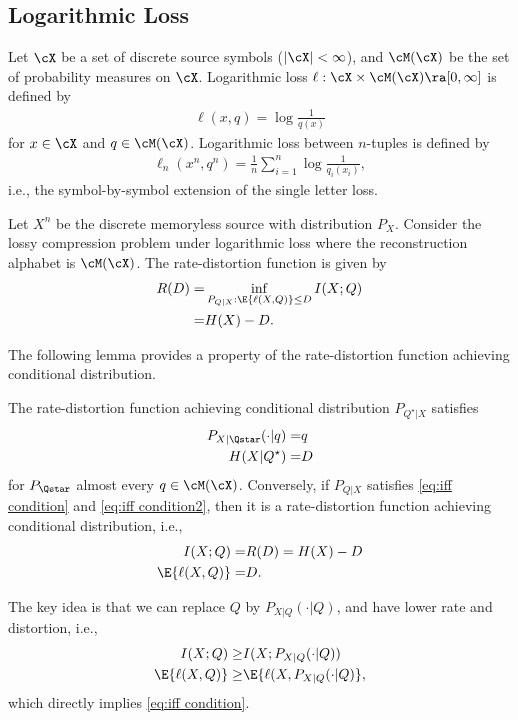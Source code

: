 \documentclass[draftclsnofoot, onecolumn, letterpaper, romanappendices]{IEEEtran}
\begin{document}
\subsection{Logarithmic Loss}\label{subsec:Logarithmic Loss}
Let $\cX$ be a set of discrete source symbols ($|\cX|<\infty$),
and $\cM(\cX)$ be the set of probability measures on $\cX$.
Logarithmic loss $\ell:\cX\times \cM(\cX) \ra [0,\infty]$ is defined by
\begin{align*}
    \ell(x,q) = \log \frac{1}{q(x)}
\end{align*}
for $x\in\cX$ and $q\in\cM(\cX)$. Logarithmic loss between $n$-tuples is defined by
\begin{align*}
    \ell_n(x^n,q^n) = \frac{1}{n}\sum_{i=1}^n\log \frac{1}{q_i(x_i)},
\end{align*}
i.e., the symbol-by-symbol extension of the single letter loss.

Let $X^n$ be the discrete memoryless source with distribution $P_X$.
Consider the lossy compression problem under logarithmic loss where
the reconstruction alphabet is $\cM(\cX)$.
The rate-distortion function is given by
\begin{align*}
    R(D) =& \inf_{P_{Q|X}: \E{\ell(X,Q)}\leq D} I(X;Q)\\
         =& H(X)-D.
\end{align*}

The following lemma provides a property of the rate-distortion function achieving
conditional distribution.
\begin{lemma}\label{lem:iff condition}
    The rate-distortion function achieving conditional distribution $P_{Q^\star|X}$ satisfies
    \begin{align}
        P_{X|\Qstar}(\cdot|q) =& q \label{eq:iff condition}\\
        H(X|Q^\star) =& D\label{eq:iff condition2}
    \end{align}
    for $P_{\Qstar}$ almost every $q\in\cM(\cX)$. 
    Conversely, if $P_{Q|X}$ satisfies \eqref{eq:iff condition} and \eqref{eq:iff condition2},
    then it is a rate-distortion function achieving conditional distribution, i.e.,
    \begin{align*}
        I(X;Q) =& R(D) = H(X)-D\\
        \E{\ell(X,Q)} =& D.
    \end{align*}
\end{lemma}
The key idea is that we can replace $Q$ by $P_{X|Q}(\cdot|Q)$,
and have lower rate and distortion, i.e.,
\begin{align*}
    I(X;Q) \geq& I(X;P_{X|Q}(\cdot|Q))\\
    \E{\ell(X,Q)} \geq& \E{\ell(X,P_{X|Q}(\cdot|Q)},
\end{align*}
which directly implies \eqref{eq:iff condition}.
\end{document}
